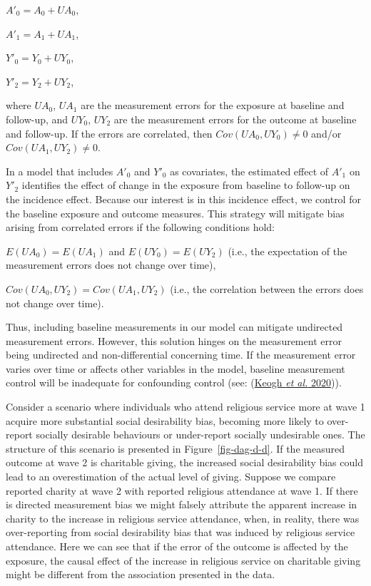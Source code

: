 \documentclass[
  singlecolumn]{article}
\begin{document}
\(A'_0 = A_0 + UA_0\),

\(A'_1 = A_1 + UA_1\),

\(Y'_0 = Y_0 + UY_0\),

\(Y'_2 = Y_2 + UY_2\),

where \(UA_0\), \(UA_1\) are the measurement errors for the exposure at
baseline and follow-up, and \(UY_0\), \(UY_2\) are the measurement
errors for the outcome at baseline and follow-up. If the errors are
correlated, then \(Cov(UA_0, UY_0) \neq 0\) and/or
\(Cov(UA_1, UY_2) \neq 0\).

In a model that includes \(A'_0\) and \(Y'_0\) as covariates, the
estimated effect of \(A'_1\) on \(Y'_2\) identifies the effect of change
in the exposure from baseline to follow-up on the incidence effect.
Because our interest is in this incidence effect, we control for the
baseline exposure and outcome measures. This strategy will mitigate bias
arising from correlated errors if the following conditions hold:

\(E(UA_0) = E(UA_1)\) and \(E(UY_0) = E(UY_2)\) (i.e., the expectation
of the measurement errors does not change over time),

\(Cov(UA_0, UY_2) = Cov(UA_1, UY_2)\) (i.e., the correlation between the
errors does not change over time).

Thus, including baseline measurements in our model can mitigate
undirected measurement errors. However, this solution hinges on the
measurement error being undirected and non-differential concerning time.
If the measurement error varies over time or affects other variables in
the model, baseline measurement control will be inadequate for
confounding control (see: (\protect\hyperlink{ref-keogh2020}{Keogh
\emph{et al.} 2020})).

Consider a scenario where individuals who attend religious service more
at wave 1 acquire more substantial social desirability bias, becoming
more likely to over-report socially desirable behaviours or under-report
socially undesirable ones. The structure of this scenario is presented
in Figure~\ref{fig-dag-d-d}. If the measured outcome at wave 2 is
charitable giving, the increased social desirability bias could lead to
an overestimation of the actual level of giving. Suppose we compare
reported charity at wave 2 with reported religious attendance at wave 1.
If there is directed measurement bias we might falsely attribute the
apparent increase in charity to the increase in religious service
attendance, when, in reality, there was over-reporting from social
desirability bias that was induced by religious service attendance. Here
we can see that if the error of the outcome is affected by the exposure,
the causal effect of the increase in religious service on charitable
giving might be different from the association presented in the data.
\end{document}

